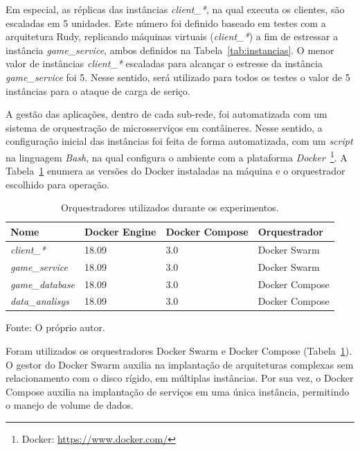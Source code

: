 Em especial, as réplicas das instâncias \textit{client\_*}, na qual executa os clientes, são escaladas em 5 unidades.
%
Este número foi definido baseado em testes com a arquitetura Rudy, replicando máquinas virtuais (\textit{client\_*}) a fim de estressar a instância \textit{game\_service}, ambos definidos na Tabela~\ref{tab:instancias}.
%
O menor valor de instâncias \textit{client\_*} escaladas para alcançar o estresse da instância \textit{game\_service} foi 5.
%
Nesse sentido, será utilizado para todos os testes o valor de 5 instâncias para o ataque de carga de seriço.


A gestão das aplicações, dentro de cada sub-rede, foi automatizada com um sistema de orquestração de microsserviços em contâineres.
%
Nesse sentido, a configuração inicial das instâncias foi feita de forma automatizada, com um \textit{script} na linguagem \textit{Bash}, na qual configura o ambiente com a plataforma \textit{Docker}~\footnote{Docker: \url{https://www.docker.com/}}.
%
A Tabela~\ref{tab:docker_versoes} enumera as versões do Docker instaladas na máquina e o orquestrador escolhido para operação.

\begin{table}[htb!]
    \centering
    \caption{Orquestradores utilizados durante os experimentos.}
    \label{tab:docker_versoes}
    \begin{tabular}{|l|l|l|l|}
    \hline
        Nome                    & Docker Engine & Docker Compose & Orquestrador   \\ \hline
        \textit{client\_*}      & 18.09         & 3.0            & Docker Swarm   \\ \hline
        \textit{game\_service}  & 18.09         & 3.0            & Docker Swarm   \\ \hline
        \textit{game\_database} & 18.09         & 3.0            & Docker Compose \\ \hline
        \textit{data\_analisys} & 18.09         & 3.0            & Docker Compose \\ \hline
    \end{tabular}

    Fonte: O próprio autor.
\end{table}

Foram utilizados os orquestradores Docker Swarm e Docker Compose (Tabela~\ref{tab:docker_versoes}).
%
O gestor do Docker Swarm auxilia na implantação de arquiteturas complexas sem relacionamento com o disco rígido, em múltiplas instâncias.
%
Por sua vez, o Docker Compose auxilia na implantação de serviços em uma única instância, permitindo o manejo de volume de dados.

